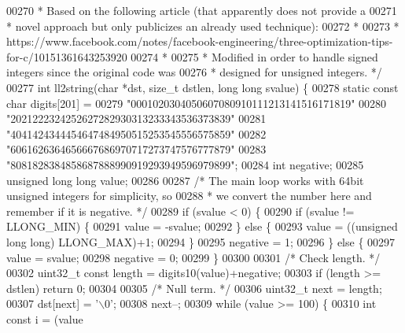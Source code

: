 \begin{DoxyCode}
00270 \textcolor{comment}{ * Based on the following article (that apparently does not provide a}
00271 \textcolor{comment}{ * novel approach but only publicizes an already used technique):}
00272 \textcolor{comment}{ *}
00273 \textcolor{comment}{ * https://www.facebook.com/notes/facebook-engineering/three-optimization-tips-for-c/10151361643253920}
00274 \textcolor{comment}{ *}
00275 \textcolor{comment}{ * Modified in order to handle signed integers since the original code was}
00276 \textcolor{comment}{ * designed for unsigned integers. */}
00277 \textcolor{keywordtype}{int} ll2string(\textcolor{keywordtype}{char} *dst, size\_t dstlen, \textcolor{keywordtype}{long} \textcolor{keywordtype}{long} svalue) \{
00278     \textcolor{keyword}{static} \textcolor{keyword}{const} \textcolor{keywordtype}{char} digits[201] =
00279         \textcolor{stringliteral}{"0001020304050607080910111213141516171819"}
00280         \textcolor{stringliteral}{"2021222324252627282930313233343536373839"}
00281         \textcolor{stringliteral}{"4041424344454647484950515253545556575859"}
00282         \textcolor{stringliteral}{"6061626364656667686970717273747576777879"}
00283         \textcolor{stringliteral}{"8081828384858687888990919293949596979899"};
00284     \textcolor{keywordtype}{int} negative;
00285     \textcolor{keywordtype}{unsigned} \textcolor{keywordtype}{long} \textcolor{keywordtype}{long} value;
00286 
00287     \textcolor{comment}{/* The main loop works with 64bit unsigned integers for simplicity, so}
00288 \textcolor{comment}{     * we convert the number here and remember if it is negative. */}
00289     \textcolor{keywordflow}{if} (svalue < 0) \{
00290         \textcolor{keywordflow}{if} (svalue != LLONG\_MIN) \{
00291             value = -svalue;
00292         \} \textcolor{keywordflow}{else} \{
00293             value = ((\textcolor{keywordtype}{unsigned} \textcolor{keywordtype}{long} \textcolor{keywordtype}{long}) LLONG\_MAX)+1;
00294         \}
00295         negative = 1;
00296     \} \textcolor{keywordflow}{else} \{
00297         value = svalue;
00298         negative = 0;
00299     \}
00300 
00301     \textcolor{comment}{/* Check length. */}
00302     uint32\_t \textcolor{keyword}{const} length = digits10(value)+negative;
00303     \textcolor{keywordflow}{if} (length >= dstlen) \textcolor{keywordflow}{return} 0;
00304 
00305     \textcolor{comment}{/* Null term. */}
00306     uint32\_t next = length;
00307     dst[next] = \textcolor{stringliteral}{'\(\backslash\)0'};
00308     next--;
00309     \textcolor{keywordflow}{while} (value >= 100) \{
00310         \textcolor{keywordtype}{int} \textcolor{keyword}{const} i = (value %

\end{DoxyCode}
